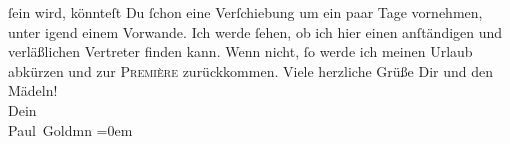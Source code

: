 \begin{ledgroupsized}[t]{13cm}
               ſein wird, könnteſt Du ſchon eine Verſchiebung um ein paar Tage vornehmen, unter
               igend einem Vorwande. Ich werde ſehen, ob ich hier einen anſtändigen und verläßlichen
                  {\pb}Vertreter finden kann. Wenn nicht, ſo werde ich
               meinen Urlaub abkürzen und zur \textsc{Première } zurückkommen.\pend
           \pstart
           Viele herzliche Grüße Dir und den Mädeln! {\\[\baselineskip]}Dein {\\[\baselineskip]}\spacefill\mbox{Paul Goldmn}\pend
           \leftskip=0em{}
         
         \endnumbering{}\end{ledgroupsized}  \newcommand{\dateiname}{L03095}\newcommand{\titel}{Paul Goldmann an Arthur Schnitzler, 13. 12. [1901]}\newcommand{\editorInnen}{Martin Anton Müller und Laura Untner}
      